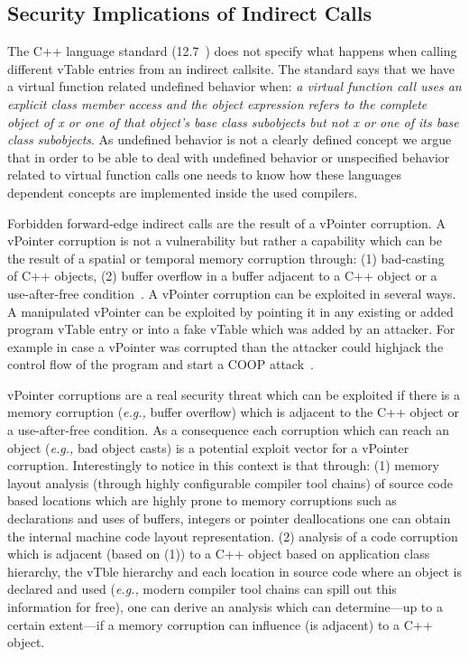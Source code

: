 \subsection{Security Implications of Indirect Calls}
\label{Security Implications of Forbidden Forward Indirect Calls}
The C++ language standard (12.7~\cite{iso:iecN3690}) does not specify
what happens when calling different vTable entries from an indirect callsite.
The standard says that we have a virtual function related undefined behavior when:
\textit{a virtual function call uses an explicit class member access and the object expression refers to the complete
object of x or one of that object’s base class subobjects but not x or one of its base class subobjects}.
As undefined behavior is not a clearly defined concept we argue that in order to be able to deal
with undefined behavior or  unspecified behavior related to virtual function calls one needs to know
how these languages dependent concepts are implemented inside the used compilers.

Forbidden forward-edge indirect calls are the result of a vPointer corruption.
A vPointer corruption is not a vulnerability but rather a capability which 
can be the result of a spatial or temporal memory corruption through: 
(1) bad-casting~\cite{byoungyoung:typecasting} of C++ objects, 
(2) buffer overflow in a buffer adjacent to a C++ object or a use-after-free condition~\cite{schuster:coop}.
A vPointer corruption can be exploited in several ways. A manipulated vPointer
can be exploited by pointing it in any existing or added program vTable entry 
or into a fake vTable which was added by an attacker. For example in case a vPointer
was corrupted than the attacker could highjack the control flow of the program 
and start a COOP attack~\cite{schuster:coop}.

vPointer corruptions are a real security threat which can be exploited if there 
is a memory corruption (\textit{e.g.,} buffer overflow) which is adjacent to
the C++ object or a use-after-free condition. As a consequence each corruption 
which can reach an object (\textit{e.g.,} bad object casts) is a potential exploit vector 
for a vPointer corruption. Interestingly to notice in this context is that through:
(1) memory layout analysis (through highly configurable compiler tool chains) of 
source code based locations which are highly prone to
memory corruptions such as declarations and uses of buffers, integers or pointer 
deallocations one can obtain the internal machine code layout representation.
(2) analysis of a code corruption which is adjacent (based on (1)) to a C++ object based on
application class hierarchy, the vTble hierarchy and each location in source code where an object
is declared and used (\textit{e.g.,} modern compiler tool chains can spill out this information for free), 
one can derive an analysis which can determine---up to a certain extent---if a memory corruption 
can influence (is adjacent) to a C++ object.

